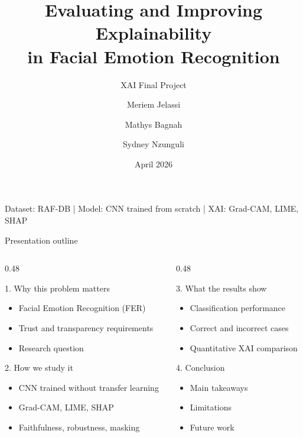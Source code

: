\documentclass[aspectratio=169,10pt]{beamer}
\title[Explainability in Facial Emotion Recognition]{Evaluating and Improving Explainability\\in Facial Emotion Recognition}
\subtitle{XAI Final Project}
\author[M. Jelassi, M. Bagnah, S. Nzunguli]{Meriem Jelassi \and Mathys Bagnah \and Sydney Nzunguli}
\institute{CentraleSupelec}
\date{April 2026}
\begin{document}

\begin{frame}
  \titlepage
  \vspace{-0.6em}
  \begin{center}
    \small
    Dataset: RAF-DB \quad | \quad Model: CNN trained from scratch \quad | \quad XAI: Grad-CAM, LIME, SHAP
  \end{center}
\end{frame}

\begin{frame}{Presentation outline}
  \begin{columns}[T,totalwidth=\textwidth]
    \begin{column}{0.48\textwidth}
      \begin{block}{1. Why this problem matters}
        \begin{itemize}
          \item Facial Emotion Recognition (FER)
          \item Trust and transparency requirements
          \item Research question
        \end{itemize}
      \end{block}
      \begin{block}{2. How we study it}
        \begin{itemize}
          \item CNN trained without transfer learning
          \item Grad-CAM, LIME, SHAP
          \item Faithfulness, robustness, masking
        \end{itemize}
      \end{block}
    \end{column}
    \begin{column}{0.48\textwidth}
      \begin{block}{3. What the results show}
        \begin{itemize}
          \item Classification performance
          \item Correct and incorrect cases
          \item Quantitative XAI comparison
        \end{itemize}
      \end{block}
      \begin{block}{4. Conclusion}
        \begin{itemize}
          \item Main takeaways
          \item Limitations
          \item Future work
        \end{itemize}
      \end{block}
    \end{column}
  \end{columns}
\end{frame}
\end{document}
